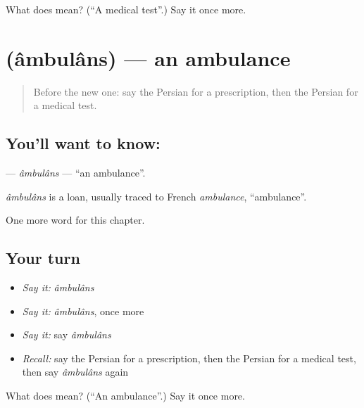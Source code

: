 \begin{tcolorbox}[breakable,colback=teal!4,colframe=teal!35!black,title={Before you move on}]
What does  mean? (\textquotedblleft{}A medical test\textquotedblright{}.) Say it once more.
\end{tcolorbox}
\section[\texorpdfstring{\fa{آمبولانس} (âmbulâns)}{آمبولانس (âmbulâns)}]{ (âmbulâns) — an ambulance}

\label{lesson:FA-C189-ambulans}



\begin{quote}
Before the new one: say the Persian for a prescription, then the Persian for a medical test.
\end{quote}

\subsection*{You'll want to know: }
\textbf{} — \emph{âmbulâns} — \textquotedblleft{}an ambulance\textquotedblright{}.

\begin{cousinweb}
\emph{âmbulâns} is a loan, usually traced to French \emph{ambulance}, \textquotedblleft{}ambulance\textquotedblright{}.
\end{cousinweb}

\begin{grammarlens}[title={What you've built}]
One more word for this chapter.
\end{grammarlens}

\subsection*{Your turn}
\begin{itemize}
\raggedright
  \item \emph{Say it:} \emph{âmbulâns}
  \item \emph{Say it:} \emph{âmbulâns}, once more
  \item \emph{Say it:} say \emph{âmbulâns}
  \item \emph{Recall:} say the Persian for a prescription, then the Persian for a medical test, then say \emph{âmbulâns} again
\end{itemize}

\begin{tcolorbox}[breakable,colback=teal!4,colframe=teal!35!black,title={Before you move on}]
What does  mean? (\textquotedblleft{}An ambulance\textquotedblright{}.) Say it once more.
\end{tcolorbox}
